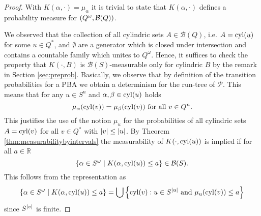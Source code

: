 \begin{proof}
  With $K(\alpha,\cdot) = \mu_{\alpha}$ it is trivial to state that
  $K(\alpha,\cdot)$ defines a probability measure for
  $\left(Q^{\omega},\mathcal{B}(Q)\right)$.

  We observed that the collection of all cylindric sets $A\in\mathcal{B}(Q)$,
  i.e. $A = \operatorname{cyl}(u)$ for some $u\in Q^{*}$, and $\emptyset$ are a generator
  which is closed under intersection and contains a countable family which
  unites to $Q^{\omega}$. Hence, it suffices to check the property that
  $K(\cdot, B)$ is $\mathcal{B}(S)$-measurable only for cylindric $B$ by the
  remark in Section \ref{sec:preprob}. Basically, we observe that by definition
  of the transition probabilities for a \ac{PBA} we obtain a determinism for
  the run-tree of $\mathcal{P}$. This means that for any $u\in S^{n}$ and
  $\alpha, \beta\in\operatorname{cyl}(u)$ holds
  \begin{equation*}
    \mu_{\alpha}(\operatorname{cyl}(v)) = \mu_{\beta}(\operatorname{cyl}(v))\text{ for all }v\in Q^{n}.
  \end{equation*}
  This justifies the use of the notion $\mu_{u}$ for the probabilities of all
  cylindric sets $A = \operatorname{cyl}(v)$ for all $v\in Q^{*}$ with
  $\left\vert{v}\right\vert\leq\left\vert{u}\right\vert$. By Theorem \ref{thm:measurabilitybyintervals} the
  measurability of $K(\cdot, \operatorname{cyl}(u))$ is implied if for all $a\in\mathbb{R}$
  \begin{equation*}
    \left\{\alpha\in S^{\omega}\mid K(\alpha, \operatorname{cyl}(u))\leq a\right\}\in\mathcal{B}(S).
  \end{equation*}
  This follows from the representation as
  \begin{equation*}
    \left\{\alpha\in S^{\omega}\mid K(\alpha, \operatorname{cyl}(u))\leq a\right\} = 
      \bigcup\left\{
        \operatorname{cyl}(v):u\in S^{\left\vert{u}\right\vert}\text{ and }\mu_{u}(\operatorname{cyl}(v))\leq a
      \right\}
  \end{equation*}
  since $S^{\left\vert{v}\right\vert}$ is finite.
\end{proof}

